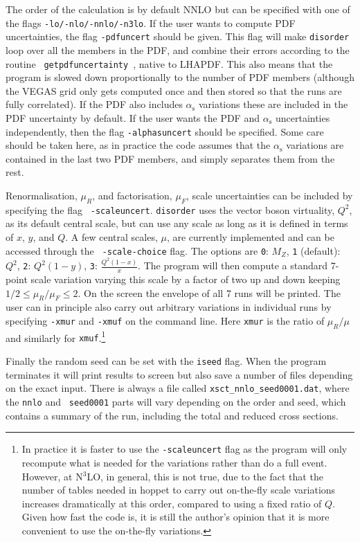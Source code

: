 \documentclass[submission, PhysCodeb]{SciPost_better_arXiv}
\newcommand{\hoppet}{{\sc hoppet}}
\newcommand{\disorder}{{\tt disorder}}
\newcommand{\as}{\alpha_{\mathrm{s}}}
\newcommand{\NNNLO}{N$^3$LO}
\begin{document}
The order of the calculation is by default NNLO but can be specified
with one of the flags {\tt -lo/-nlo/-nnlo/-n3lo}. If the user wants to
compute PDF uncertainties, the flag {\tt -pdfuncert} should be
given. This flag will make \disorder{} loop over all the members in
the PDF, and combine their errors according to the routine {\tt
  getpdfuncertainty}~\cite{Watt:2011kp}, native to LHAPDF. This also
means that the program is slowed down proportionally to the number of
PDF members (although the VEGAS grid only gets computed once and then
stored so that the runs are fully correlated). If the PDF also
includes $\as$ variations these are included in the PDF uncertainty by
default. If the user wants the PDF and $\as$ uncertainties
independently, then the flag {\tt -alphasuncert} should be
specified. Some care should be taken here, as in practice the code
assumes that the $\as$ variations are contained in the last two PDF
members, and simply separates them from the rest.

Renormalisation, $\mu_R$, and factorisation, $\mu_F$, scale
uncertainties can be included by specifying the flag {\tt
  -scaleuncert}. \disorder{} uses the vector boson virtuality, $Q^2$,
as its default central scale, but can use any scale as long as it is
defined in terms of $x$, $y$, and $Q$. A few central scales, $\mu$,
are currently implemented and can be accessed through the {\tt
  -scale-choice} flag. The options are {\tt 0}: $M_Z$, {\tt 1}
(default): $Q^2$, {\tt 2}: $Q^2(1-y)$, {\tt 3}:
$\frac{Q^2(1-x)}{x}$. The program will then compute a standard 7-point
scale variation varying this scale by a factor of two up and down
keeping $1/2\le \mu_R/\mu_F\le 2$. On the screen the envelope of all 7
runs will be printed. The user can in principle also carry out
arbitrary variations in individual runs by specifying {\tt -xmur} and
{\tt -xmuf} on the command line. Here {\tt xmur} is the ratio of
$\mu_R/\mu$ and similarly for {\tt xmuf}.\footnote{In practice it is
faster to use the {\tt -scaleuncert} flag as the program will only
recompute what is needed for the variations rather than do a full
event. However, at \NNNLO{}, in general, this is not true, due to the
fact that the number of tables needed in \hoppet{} to carry out
on-the-fly scale variations increases dramatically at this order,
compared to using a fixed ratio of $Q$. Given how fast the code is, it
is still the author's opinion that it is more convenient to use the
on-the-fly variations.}

Finally the random seed can be set with the {\tt iseed} flag. When the
program terminates it will print results to screen but also save a
number of files depending on the exact input. There is always a file
called {\tt xsct\_nnlo\_seed0001.dat}, where the {\tt nnlo} and {\tt
  seed0001} parts will vary depending on the order and seed, which
contains a summary of the run, including the total and reduced cross
sections. 
\end{document}
